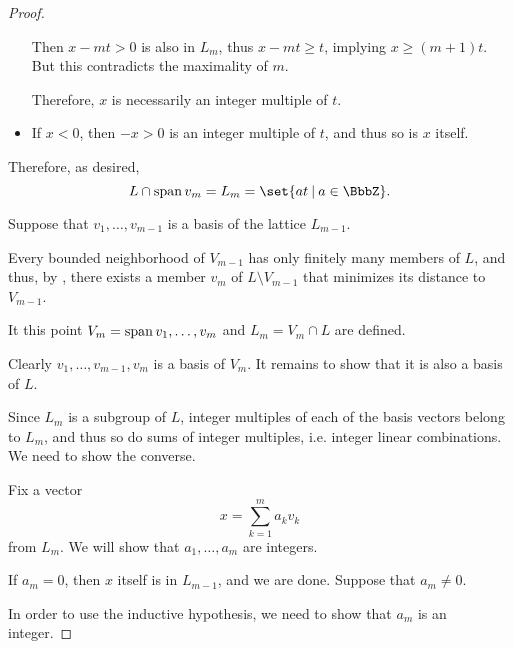 \begin{proof}
\begin{itemize}
    Then \( x - mt > 0 \) is also in \( L_m \), thus \( x - mt \geq t \), implying \( x \geq (m + 1)t \). But this contradicts the maximality of \( m \).

    Therefore, \( x \) is necessarily an integer multiple of \( t \).

    \item If \( x < 0 \), then \( -x > 0 \) is an integer multiple of \( t \), and thus so is \( x \) itself.
  \end{itemize}

  Therefore, as desired,
  \begin{equation*}
    L \cap \linspan{ v_m } = L_m = \set{ at \given a \in \BbbZ }.
  \end{equation*}

   Suppose that \( v_1, \ldots, v_{m-1} \) is a basis of the lattice \( L_{m-1} \).

  Every bounded neighborhood of \( V_{m-1} \) has only finitely many members of \( L \), and thus, by , there exists a member \( v_m \) of \( L \setminus V_{m-1} \) that minimizes its distance to \( V_{m-1} \).

  It this point \( V_m = \operatorname{span}{ v_1, \ldots, v_m } \) and \( L_m = V_m \cap L \) are defined.

  Clearly \( v_1, \ldots, v_{m-1}, v_m \) is a basis of \( V_m \). It remains to show that it is also a basis of \( L \).

  Since \( L_m \) is a subgroup of \( L \), integer multiples of each of the basis vectors belong to \( L_m \), and thus so do sums of integer multiples, i.e. integer linear combinations. We need to show the converse.

  Fix a vector
  \begin{equation*}
    x = \sum_{k=1}^m a_k v_k
  \end{equation*}
  from \( L_m \). We will show that \( a_1, \ldots, a_m \) are integers.

  If \( a_m = 0 \), then \( x \) itself is in \( L_{m-1} \), and we are done. Suppose that \( a_m \neq 0 \).

  In order to use the inductive hypothesis, we need to show that \( a_m \) is an integer.


\end{proof}
